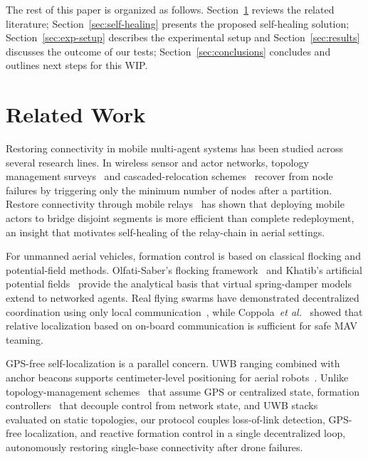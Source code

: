 \documentclass[conference]{IEEEtran}
\begin{document}
The rest of this paper is organized as follows. Section~\ref{sec:related-work} reviews 
the related literature; Section~\ref{sec:self-healing} presents the proposed self-healing 
solution; Section~\ref{sec:exp-setup} describes the experimental setup and Section~\ref{sec:results} 
discusses the outcome of our tests; Section~\ref{sec:conclusions} concludes and outlines 
next steps for this WIP.


\section{Related Work}
\label{sec:related-work}
Restoring connectivity in mobile multi-agent systems has been studied across
several research lines. In wireless sensor and actor networks, topology
management surveys~\cite{younis2014topology} and cascaded-relocation
schemes~\cite{abbasi2009recovering} recover from node failures by triggering
only the minimum number of nodes after a partition. Restore connectivity
through mobile relays~\cite{senel2011optimized} has shown that deploying mobile
actors to bridge disjoint segments is more efficient than complete redeployment,
an insight that motivates self-healing of the relay-chain in aerial settings.

For unmanned aerial vehicles, formation control is based on classical flocking
and potential-field methods. Olfati-Saber's flocking
framework~\cite{olfatisaber2006flocking} and Khatib's artificial potential
fields~\cite{khatib1986real} provide the analytical basis that virtual
spring-damper models~\cite{piemngam2019virtual, chen2015virtual} extend to
networked agents. Real flying swarms have demonstrated decentralized
coordination using only local
communication~\cite{hauert2011reynolds, vasarhelyi2018optimized}, while
Coppola~\textit{et al.}~\cite{coppola2018onboard} showed that 
relative localization based on on-board communication is sufficient for safe MAV teaming.

GPS-free self-localization is a parallel concern. UWB ranging combined with
anchor beacons supports centimeter-level positioning for aerial
robots~\cite{hamer2018selfcalibrating, mai2018local}. Unlike topology-management 
schemes~\cite{younis2014topology, abbasi2009recovering} that assume GPS or 
centralized state, formation controllers~\cite{olfatisaber2006flocking, piemngam2019virtual} 
that decouple control from network state, and UWB stacks~\cite{hamer2018selfcalibrating, mai2018local} 
evaluated on static topologies, our protocol couples loss-of-link detection, 
GPS-free localization, and reactive formation control in a single decentralized 
loop, autonomously restoring single-base connectivity after drone failures.
\end{document}
